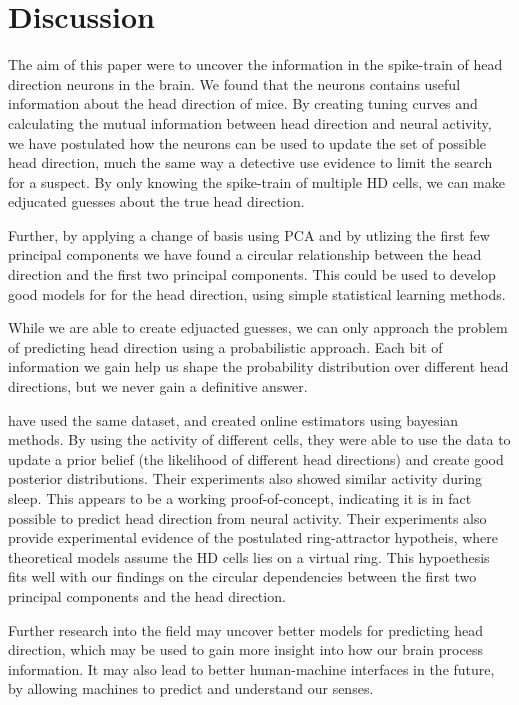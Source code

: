 \section{Discussion}
The aim of this paper were to uncover the information in the spike-train of head direction neurons in the brain.
We found that the neurons contains useful information about the head direction of mice. By creating tuning curves and calculating the mutual information between head direction and neural activity, we have postulated how the neurons can be used to update the set of possible head direction, much the same way a detective use evidence to limit the search for a suspect. By only knowing the spike-train of multiple HD cells, we can make edjucated guesses about the true head direction.

Further, by applying a change of basis using PCA and by utlizing the first few principal components we have found a circular relationship between the head direction and the first two principal components.  This could be used to develop good models for for the head direction, using simple statistical learning methods. 

While we are able to create edjuacted guesses, we can only approach the problem of predicting head direction using a probabilistic approach. Each bit of information we gain help us shape the probability distribution over different head directions, but we never gain a definitive answer. 


\cite{projectdata} have used the same dataset, and created online estimators using bayesian methods. By using the activity of different cells, they were able to use the data to update a prior belief (the likelihood of different head directions) and create good posterior distributions. Their experiments also showed similar activity during sleep. This appears to be a working proof-of-concept, indicating it is in fact possible to predict head direction from neural activity. Their experiments also provide experimental evidence of the postulated ring-attractor hypotheis, where theoretical models assume the HD cells lies on a virtual ring. This hypoethesis fits well with our findings on the circular dependencies between the first two principal components and the head direction.  

Further research into the field may uncover better models for predicting head direction, which may be used to gain more insight into how our brain process information. It may also lead to better human-machine interfaces in the future, by allowing machines to predict and understand our senses. 